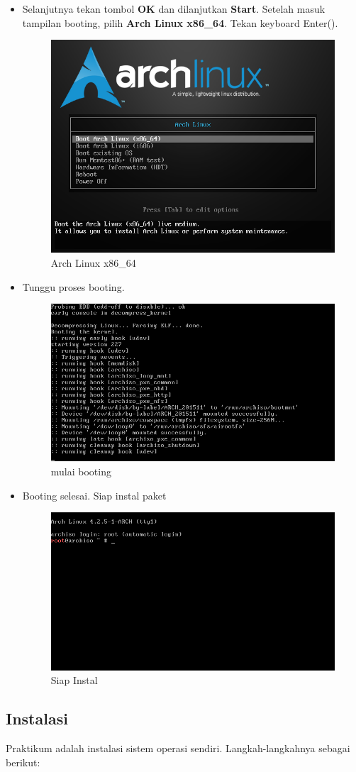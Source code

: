 \documentclass[12pt,]{article}
\begin{document}
\begin{itemize}
		\item Selanjutnya tekan tombol \textbf{OK} dan dilanjutkan \textbf{Start}.
		Setelah masuk tampilan booting, pilih \textbf{Arch Linux x86\_64}.
		Tekan keyboard Enter(\keys{\return}).
		\begin{figure}[H]
			\centering
			\includegraphics[width=0.4\linewidth]{images/vbox_linuxinstall/s1}
			\caption{Arch Linux x86\_64}
		\end{figure}
	
		\item Tunggu proses booting.
		\begin{figure}[H]
			\centering
			\includegraphics[width=0.4\linewidth]{images/vbox_linuxinstall/s2}
			\caption{mulai booting}
		\end{figure}
	
		\item Booting selesai. Siap instal paket
		\begin{figure}[H]
			\centering
			\includegraphics[width=0.4\linewidth]{images/vbox_linuxinstall/s3}
			\caption{Siap Instal}
		\end{figure}
	\end{itemize}
	
	\subsection{Instalasi}
	Praktikum adalah instalasi sistem operasi sendiri.
	Langkah-langkahnya sebagai berikut:
\end{document}
